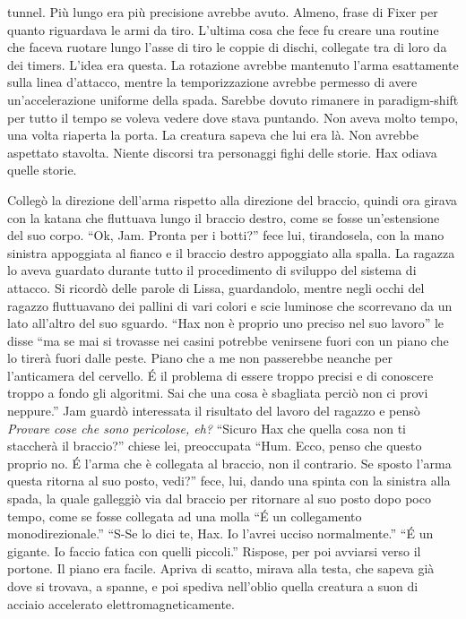     tunnel. Più lungo era più precisione avrebbe avuto. Almeno, frase di
    Fixer per quanto riguardava le armi da tiro. L'ultima cosa che fece fu
    creare una routine che faceva ruotare lungo l'asse di tiro le coppie di
    dischi, collegate tra di loro da dei timers. L'idea era questa. La
    rotazione avrebbe mantenuto l'arma esattamente sulla linea d'attacco,
    mentre la temporizzazione avrebbe permesso di avere un'accelerazione
    uniforme della spada. Sarebbe dovuto rimanere in paradigm-shift per
    tutto il tempo se voleva vedere dove stava puntando. Non aveva molto
    tempo, una volta riaperta la porta. La creatura sapeva che lui era là.
    Non avrebbe aspettato stavolta. Niente discorsi tra personaggi fighi
    delle storie. Hax odiava quelle storie.
    
    Collegò la direzione dell'arma
    rispetto alla direzione del braccio, quindi ora girava con la katana
    che fluttuava lungo il braccio destro, come se fosse un'estensione del
    suo corpo. ``Ok, Jam. Pronta per i botti?'' fece lui, tirandosela, con
    la mano sinistra appoggiata al fianco e il braccio destro appoggiato
    alla spalla. La
    ragazza lo aveva guardato durante tutto il procedimento di sviluppo del
    sistema di attacco. Si ricordò delle parole di Lissa, guardandolo,
    mentre negli occhi del ragazzo fluttuavano dei pallini di vari colori e
    scie luminose che scorrevano da un lato all'altro del suo sguardo.
    ``Hax non è proprio uno preciso nel suo lavoro'' le disse ``ma se mai
    si trovasse nei casini potrebbe venirsene fuori con un piano che lo
    tirerà fuori dalle peste. Piano che a me non passerebbe neanche per
    l'anticamera del cervello. \'E il problema di essere troppo precisi e
    di conoscere troppo a fondo gli algoritmi. Sai che una cosa è sbagliata
    perciò non ci provi neppure.'' Jam guardò interessata il risultato del
    lavoro del ragazzo e pensò \emph{Provare cose che sono pericolose,
    eh?} ``Sicuro Hax che quella cosa non ti staccherà il braccio?'' chiese
    lei, preoccupata ``Hum. Ecco, penso che questo proprio no. \'E l'arma
    che è collegata al braccio, non il contrario. Se sposto l'arma questa
    ritorna al suo posto, vedi?'' fece, lui, dando una spinta con la
    sinistra alla spada, la quale galleggiò via dal braccio per ritornare
    al suo posto dopo poco tempo, come se fosse collegata ad una molla
    ``\'E un collegamento monodirezionale.'' ``S-Se lo dici te, Hax. Io
    l'avrei ucciso normalmente.'' ``\'E un gigante. Io faccio fatica con
    quelli piccoli.'' Rispose, per poi avviarsi verso il portone. Il piano
    era facile. Apriva di scatto, mirava alla testa, che sapeva già dove si
    trovava, a spanne, e poi spediva nell'oblio quella creatura a suon di
    acciaio accelerato elettromagneticamente.

